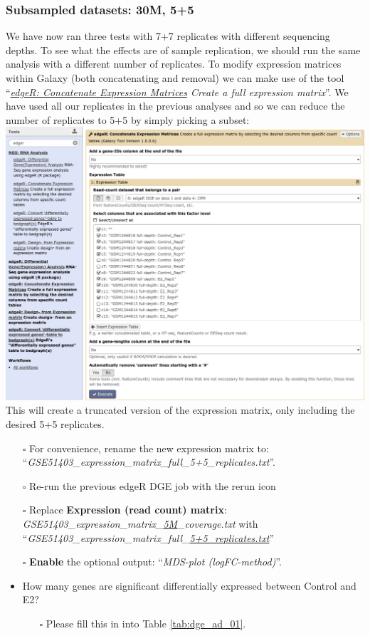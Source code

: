 \documentclass[11pt,a4paper]{article}
\begin{document}
\subsubsection{Subsampled datasets: 30M, 5+5}
We have now ran three tests with 7+7 replicates with different sequencing depths. To see what the effects are of sample replication, we should run the same analysis with a different number of replicates. To modify expression matrices within Galaxy (both concatenating and removal) we can make use of the tool ``\textit{\underline{edgeR: Concatenate Expression Matrices} Create a full expression matrix}''. We have used all our replicates in the previous analyses and so we can reduce the number of replicates to 5+5 by simply picking a subset:\\
\includegraphics[width=\textwidth]{figures/expression_03.png}\\
This will create a truncated version of the expression matrix, only including the desired 5+5 replicates.
\begin{itemize}
	\item [$\square$] For convenience, rename the new expression matrix to:\\``\textit{GSE51403\_expression\_matrix\_full\_5+5\_replicates.txt}''.
	\item [$\square$] Re-run the previous edgeR DGE job with the rerun icon
	\item [$\square$] Replace \textbf{Expression (read count) matrix}: \textit{GSE51403\_expression\_matrix\_\underline{5M}\_coverage.txt} with ``\textit{GSE51403\_expression\_matrix\_full\_\underline{5+5\_replicates.txt}}''
	\item [$\square$] \textbf{Enable} the optional output: ``\textit{MDS-plot (logFC-method)}''.
	\item How many genes are significant differentially expressed between Control and E2?
	\begin{itemize}
		\item[$\square$] Please fill this in into Table \ref{tab:dge_ad_01}.
	\end{itemize}	
\end{itemize}
\end{document}

